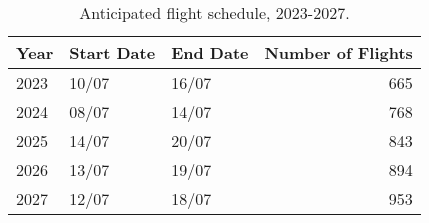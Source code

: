 \begin{table}[ht]
\centering
\begin{tabular}{lllr}
  \hline
{\textbf{Year}} & {\textbf{Start Date}} & {\textbf{End Date}} & {\textbf{Number of Flights}} \\ 
  \hline
2023 & 10/07 & 16/07 & 665 \\ 
  2024 & 08/07 & 14/07 & 768 \\ 
  2025 & 14/07 & 20/07 & 843 \\ 
  2026 & 13/07 & 19/07 & 894 \\ 
  2027 & 12/07 & 18/07 & 953 \\ 
   \hline
\end{tabular}
\caption{Anticipated flight schedule, 2023-2027. \label{tab:anticipated_schedule}} 
\end{table}
